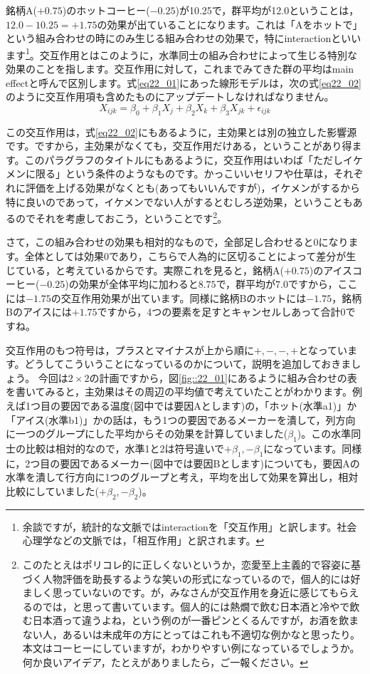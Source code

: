\documentclass{ltjsarticle}
\begin{document}
銘柄A($+0.75$)のホットコーヒー($-0.25$)が10.25で，群平均が12.0ということは，$12.0-10.25=+1.75$の効果が出ていることになります。これは「Aをホットで」という組み合わせの時にのみ生じる組み合わせの効果で，特にinteractionといいます\footnote{余談ですが，統計的な文脈ではinteractionを「交互作用」と訳します。社会心理学などの文脈では，「相互作用」と訳されます。}。交互作用とはこのように，水準同士の組み合わせによって生じる特別な効果のことを指します。交互作用に対して，これまでみてきた群の平均はmain effectと呼んで区別します。式\ref{eq22_01}にあった線形モデルは，次の式\ref{eq22_02}のように交互作用項も含めたものにアップデートしなければなりません。
\begin{equation}
  \label{eq22_02}
X_{ijk} = \beta_0  + \beta_1 X_j  + \beta_2 X_k + \beta_3 X_{jk} + \epsilon_{ijk}
\end{equation}

この交互作用は，式\ref{eq22_02}にもあるように，主効果とは別の独立した影響源です。ですから，主効果がなくても，交互作用だけある，ということがあり得ます。このパラグラフのタイトルにもあるように，交互作用はいわば「ただしイケメンに限る」という条件のようなものです。かっこいいセリフや仕草は，それぞれに評価を上げる効果がなくとも(あってもいいんですが)，イケメンがするから特に良いのであって，イケメンでない人がするとむしろ逆効果，ということもあるのでそれを考慮しておこう，ということです\footnote{このたとえはポリコレ的に正しくないというか，恋愛至上主義的で容姿に基づく人物評価を助長するような笑いの形式になっているので，個人的には好ましく思っていないのです。が，みなさんが交互作用を身近に感じてもらえるのでは，と思って書いています。個人的には熱燗で飲む日本酒と冷やで飲む日本酒って違うよね，という例のが一番ピンとくるんですが，お酒を飲まない人，あるいは未成年の方にとってはこれも不適切な例かなと思ったり。本文はコーヒーにしていますが，わかりやすい例になっているでしょうか。何か良いアイデア，たとえがありましたら，ご一報ください。}。

さて，この組み合わせの効果も相対的なもので，全部足し合わせると$0$になります。全体としては効果$0$であり，こちらで人為的に区切ることによって差分が生じている，と考えているからです。実際これを見ると，銘柄A($+0.75$)のアイスコーヒー($-0.25$)の効果が全体平均に加わると$8.75$で，群平均が$7.0$ですから，ここには$-1.75$の交互作用効果が出ています。同様に銘柄Bのホットには$-1.75$，銘柄Bのアイスには$+1.75$ですから，4つの要素を足すとキャンセルしあって合計$0$ですね。

交互作用のもつ符号は，プラスとマイナスが上から順に$+,-,-,+$となっています。どうしてこういうことになっているのかについて，説明を追加しておきましょう。
今回は$2\times2$の計画ですから，図\ref{fig::22_01}にあるように組み合わせの表を書いてみると，主効果はその周辺の平均値で考えていたことがわかります。例えば1つ目の要因である温度(図中では要因Aとします)の，「ホット(水準a1)」か「アイス(水準b1)」かの話は，もう1つの要因であるメーカーを潰して，列方向に一つのグループにした平均からその効果を計算していました($\beta_1$)。この水準同士の比較は相対的なので，水準1と2は符号違いで$+\beta_1,-\beta_1$になっています。同様に，2つ目の要因であるメーカー(図中では要因Bとします)についても，要因Aの水準を潰して行方向に1つのグループと考え，平均を出して効果を算出し，相対比較にしていました($+\beta_2,-\beta_2$)。
\end{document}
